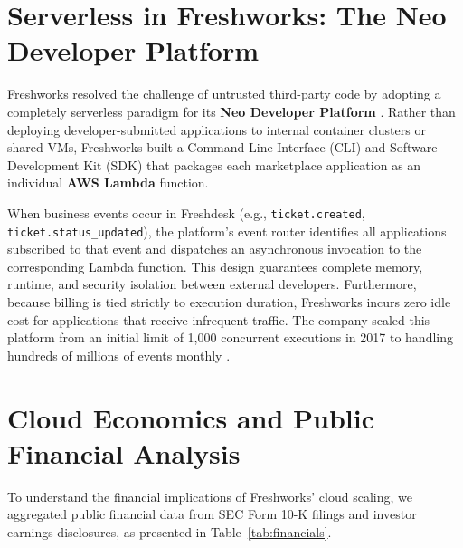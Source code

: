 \documentclass[10pt,a4paper]{article}
\begin{document}
\section{Serverless in Freshworks: The Neo Developer Platform}
Freshworks resolved the challenge of untrusted third-party code by adopting a completely serverless paradigm for its \textbf{Neo Developer Platform} \cite{aws_freshworks_lambda}. Rather than deploying developer-submitted applications to internal container clusters or shared VMs, Freshworks built a Command Line Interface (CLI) and Software Development Kit (SDK) that packages each marketplace application as an individual \textbf{AWS Lambda} function.

When business events occur in Freshdesk (e.g., \texttt{ticket.created}, \texttt{ticket.status\_updated}), the platform's event router identifies all applications subscribed to that event and dispatches an asynchronous invocation to the corresponding Lambda function. This design guarantees complete memory, runtime, and security isolation between external developers. Furthermore, because billing is tied strictly to execution duration, Freshworks incurs zero idle cost for applications that receive infrequent traffic. The company scaled this platform from an initial limit of 1,000 concurrent executions in 2017 to handling hundreds of millions of events monthly \cite{aws_freshworks_lambda}.

\section{Cloud Economics and Public Financial Analysis}
To understand the financial implications of Freshworks' cloud scaling, we aggregated public financial data from SEC Form 10-K filings and investor earnings disclosures, as presented in Table~\ref{tab:financials}.
\end{document}
